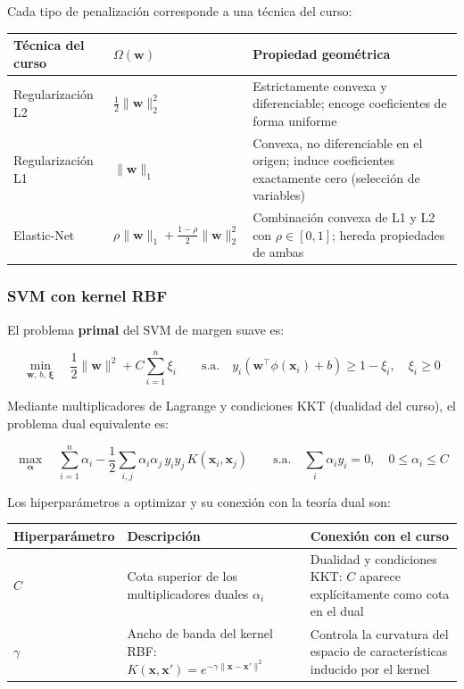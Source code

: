 \documentclass[spanish]{article}
\begin{document}
Cada tipo de penalización corresponde a una técnica del curso:

\begin{center}
\begin{tabular}{lp{3.8cm}p{6cm}}
\toprule
\textbf{Técnica del curso} & \textbf{$\Omega(\mathbf{w})$} & \textbf{Propiedad geométrica} \\
\midrule
Regularización L2 & $\tfrac{1}{2}\|\mathbf{w}\|_2^2$ & Estrictamente convexa y diferenciable; encoge coeficientes de forma uniforme \\
Regularización L1 & $\|\mathbf{w}\|_1$ & Convexa, no diferenciable en el origen; induce coeficientes exactamente cero (selección de variables) \\
Elastic-Net & $\rho\|\mathbf{w}\|_1 + \tfrac{1-\rho}{2}\|\mathbf{w}\|_2^2$ & Combinación convexa de L1 y L2 con $\rho \in [0,1]$; hereda propiedades de ambas \\
\bottomrule
\end{tabular}
\end{center}

\subsubsection{SVM con kernel RBF}

El problema \textbf{primal} del SVM de margen suave es:

\begin{equation}
\min_{\mathbf{w},\, b,\, \boldsymbol{\xi}} \quad \frac{1}{2}\|\mathbf{w}\|^2 + C\sum_{i=1}^{n}\xi_i \qquad \text{s.a.} \quad y_i\!\left(\mathbf{w}^\top\phi(\mathbf{x}_i)+b\right) \geq 1-\xi_i,\quad \xi_i \geq 0
\end{equation}

Mediante multiplicadores de Lagrange y condiciones KKT (dualidad del curso), el problema dual equivalente es:

\begin{equation}
\max_{\boldsymbol{\alpha}} \quad \sum_{i=1}^{n}\alpha_i - \frac{1}{2}\sum_{i,j}\alpha_i\alpha_j\,y_iy_j\,K(\mathbf{x}_i,\mathbf{x}_j) \qquad \text{s.a.} \quad \sum_i\alpha_iy_i=0,\quad 0\leq\alpha_i\leq C
\end{equation}

Los hiperparámetros a optimizar y su conexión con la teoría dual son:

\begin{center}
\begin{tabular}{lp{4.5cm}p{5.5cm}}
\toprule
\textbf{Hiperparámetro} & \textbf{Descripción} & \textbf{Conexión con el curso} \\
\midrule
$C$ & Cota superior de los multiplicadores duales $\alpha_i$ & Dualidad y condiciones KKT: $C$ aparece explícitamente como cota en el dual \\
$\gamma$ & Ancho de banda del kernel RBF: $K(\mathbf{x},\mathbf{x}') = e^{-\gamma\|\mathbf{x}-\mathbf{x}'\|^2}$ & Controla la curvatura del espacio de características inducido por el kernel \\
\bottomrule
\end{tabular}
\end{center}
\end{document}
